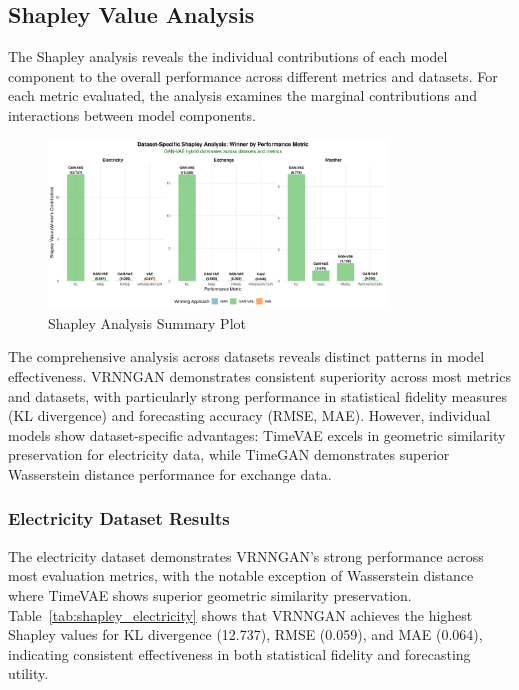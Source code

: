 \documentclass{article}
\begin{document}
\subsection{Shapley Value Analysis}
The Shapley analysis reveals the individual contributions of each model component to the overall performance across different metrics and datasets. For each metric evaluated, the analysis examines the marginal contributions and interactions between model components.


\begin{figure}[H]
\centering
\includegraphics[width=0.8\textwidth]{assets/shapley_dataset_winners-final.png}
\caption{Shapley Analysis Summary Plot}
\label{fig:shap}
\end{figure}

The comprehensive analysis across datasets reveals distinct patterns in model effectiveness. VRNNGAN demonstrates consistent superiority across most metrics and datasets, with particularly strong performance in statistical fidelity measures (KL divergence) and forecasting accuracy (RMSE, MAE). However, individual models show dataset-specific advantages: TimeVAE excels in geometric similarity preservation for electricity data, while TimeGAN demonstrates superior Wasserstein distance performance for exchange data. 

\subsubsection{Electricity Dataset Results}

The electricity dataset demonstrates VRNNGAN's strong performance across most evaluation metrics, with the notable exception of Wasserstein distance where TimeVAE shows superior geometric similarity preservation. Table~\ref{tab:shapley_electricity} shows that VRNNGAN achieves the highest Shapley values for KL divergence (12.737), RMSE (0.059), and MAE (0.064), indicating consistent effectiveness in both statistical fidelity and forecasting utility.
\end{document}
